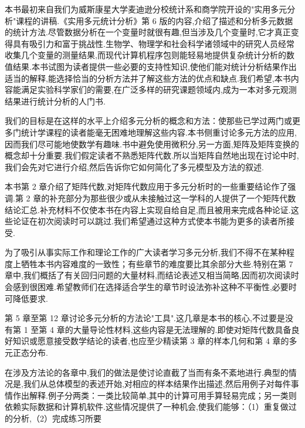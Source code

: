 \clearpage
{}


\noindent 本书最初来自我们为威斯康星大学麦迪逊分校统计系和商学院开设的"实用多元分析"课程的讲稿.《实用多元统计分析》第 6 版的内容,介绍了描述和分析多元数据的统计方法.尽管数据分析在一个变量时就很有趣,但当涉及几个变量时,它才真正变得具有吸引力和富于挑战性.生物学、物理学和社会科学诸领域中的研究人员经常收集几个变量的测量结果,而现代计算机程序包则能轻易地提供复杂统计分析的数值结果.本书试图为读者提供一些必要的支持性知识,使他们能对统计分析结果作出适当的解释,能选择恰当的分析方法并了解这些方法的优点和缺点.我们希望,本书内容能满足实验科学家们的需要,在广泛多样的研究课题领域内,成为一本对多元观测结果进行统计分析的人门书.


\noindent 我们的目标是在这样的水平上介绍多元分析的概念和方法：使那些已学过两门或更多门统计学课程的读者能毫无困难地理解这些内容.本书侧重讨论多元方法的应用,因而我们尽可能地使数学有趣味.书中避免使用微积分,另一方面,矩阵及矩阵变换的概念却十分重要.我们假定读者不熟悉矩阵代数.所以当矩阵自然地出现在讨论中时,我们会先对它进行介绍,然后告诉你它如何简化了多元模型及方法的叙述.

\noindent 本书第 2 章介绍了矩阵代数,对矩阵代数应用于多元分析时的一些重要结论作了强调.第 2 章的补充部分为那些很少或从未接触过这一学科的人提供了一个矩阵代数结论汇总.补充材料不仅使本书在内容上实现自给自足,而且被用来完成各种论证.这些论证在初次阅读时可以跳过.我们希望通过这种方式使本书能为更多的读者所接受.

\noindent 为了吸引从事实际工作和理论工作的广大读者学习多元分析,我们不得不在某种程度上牺牲本书内容难度的一致性；有些章节的难度要比其余部分大些.特别在第 7 章中,我们概括了有关回归问题的大量材料,而结论表述又相当简略,因而初次阅读时会感到很困难.希望教师们在选择适合学生的章节时设法弥补这种不平衡性,必要时可降低要求.


\noindent 第 5 章至第 12 章讨论多元分析的方法论"工具".这几章是本书的核心,不过要是没有第 1 至第 4 章的大量导论性材料,这些内容是无法理解的.即使对矩阵代数具备良好知识或愿意接受数学结论的读者,也应至少精读第 3 章的样本几何和第 4 章的多元正态分布.

\noindent 在涉及方法论的各章中,我们的做法是使讨论直截了当而有条不紊地进行.典型的情况是,我们从总体模型的表述开始,对相应的样本结果作出描述,然后用例子对每件事情作出解释.例子分两类：一类比较简单,其中的计算可用手算轻易完成；另一类则依赖实际数据和计算机软件.这些情况提供了一种机会,使我们能够：（1）重复做过的分析,（2）完成练习所要

